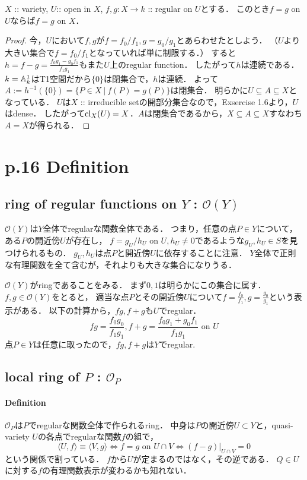 \documentclass[a4paper]{jarticle}
\begin{document}
    \begin{Lemma}
        $X$ :: variety, $U$:: open in $X$, $f, g: X \to k$ :: regular on $U$とする．
        このとき$f=g$ on $U$ならば$f=g$ on $X$．
    \end{Lemma}
    \begin{proof}
    今，$U$において$f,g$が$f=f_0/f_1, g=g_0/g_1$とあらわせたとしよう．
    （$U$より大きい集合で$f=f_0/f_1$となっていれば単に制限する．）
    すると$h=f-g=\frac{f_0 g_1-g_0 f_1}{f_1 g_1}$もまた$U$上のregular function．
    したがって$h$は連続である．
    $k=\mathbb{A}^1_k$はT1空間だから$\{0\}$は閉集合で，$h$は連続．
    よって$A:=h^{-1}(\{0\})=\{P \in X ~|~ f(P)=g(P)\}$は閉集合．
    明らかに$U \subseteq A \subseteq X$となっている．
    $U$は$X$ :: irreducible setの開部分集合なので，Exsercise 1.6より，$U$はdense．
    したがって$\operatorname{cl}_{X}(U)=X$．$A$は閉集合であるから，$X \subseteq A \subseteq X$すなわち$A=X$が得られる．
    \end{proof}


\section{p.16 Definition}
    \subsection{ring of regular functions on $Y$ : $\mathcal{O}(Y)$}
    $\mathcal{O}(Y)$は$Y$全体でregularな関数全体である．
    つまり，任意の点$P \in Y$について，ある$P$の開近傍$U$が存在し，
    $f=g_U/h_U \mbox{ on }U, h_U \neq 0$であるような$g_U,h_U \in S$を見つけられるもの．
    $g_U,h_U$は点$P$と開近傍$U$に依存することに注意．
    $Y$全体で正則な有理関数を全て含むが，それよりも大きな集合になりうる．

    $\mathcal{O}(Y)$がringであることをみる．
    まず$0, 1$は明らかにこの集合に属す．
    $f,g \in \mathcal{O}(Y)$をとると，
    適当な点$P$とその開近傍$U$について$f=\frac{f_0}{f_1}, g=\frac{g_0}{g_1}$という表示がある．
    以下の計算から，$fg, f+g$も$U$でregular．
    \[ fg=\frac{f_0 g_0}{f_1 g_1}, f+g=\frac{f_0 g_1+g_0 f_1}{f_1 g_1} \mbox{ on } U \]
    点$P \in Y$は任意に取ったので，$fg, f+g$は$Y$でregular.

    \subsection{local ring of $P$ : $\mathcal{O}_P$}
    \paragraph{Definition}
    $\mathcal{O}_P$は$P$でregularな関数全体で作られるring．
    中身は$P$の開近傍$U \subset Y$と，quasi-variety $U$の各点でregularな関数$f$の組で，
    \[ \langle U,f \rangle \equiv \langle V,g \rangle \iff f=g \mbox{ on }U \cap V \iff (f-g)|_{U \cap V}=0 \]
    という関係で割っている．
    $f$から$U$が定まるのではなく，その逆である．
    $Q \in U$に対する$f$の有理関数表示が変わるかも知れない．
\end{document}
